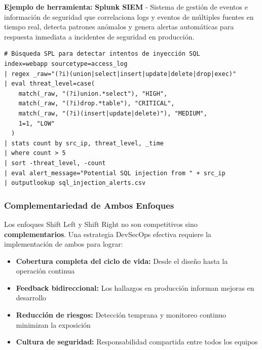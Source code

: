 {\textbf{Ejemplo de herramienta:} \textbf{Splunk SIEM} - Sistema de gestión de eventos e información de seguridad que correlaciona logs y eventos de múltiples fuentes en tiempo real, detecta patrones anómalos y genera alertas automáticas para respuesta inmediata a incidentes de seguridad en producción.

\begin{lstlisting}[language=spl, caption=Consulta Splunk para detección de anomalías]
# Búsqueda SPL para detectar intentos de inyección SQL
index=webapp sourcetype=access_log
| regex _raw="(?i)(union|select|insert|update|delete|drop|exec)"
| eval threat_level=case(
    match(_raw, "(?i)union.*select"), "HIGH",
    match(_raw, "(?i)drop.*table"), "CRITICAL",
    match(_raw, "(?i)(insert|update|delete)"), "MEDIUM",
    1=1, "LOW"
  )
| stats count by src_ip, threat_level, _time
| where count > 5
| sort -threat_level, -count
| eval alert_message="Potential SQL injection from " + src_ip
| outputlookup sql_injection_alerts.csv
\end{lstlisting}

\subsubsection{Complementariedad de Ambos Enfoques}

Los enfoques Shift Left y Shift Right no son competitivos sino \textbf{complementarios}. Una estrategia DevSecOps efectiva requiere la implementación de ambos para lograr:

\begin{itemize}
    \item \textbf{Cobertura completa del ciclo de vida:} Desde el diseño hasta la operación continua
    \item \textbf{Feedback bidireccional:} Los hallazgos en producción informan mejoras en desarrollo
    \item \textbf{Reducción de riesgos:} Detección temprana y monitoreo continuo minimizan la exposición
    \item \textbf{Cultura de seguridad:} Responsabilidad compartida entre todos los equipos
\end{itemize}

}
